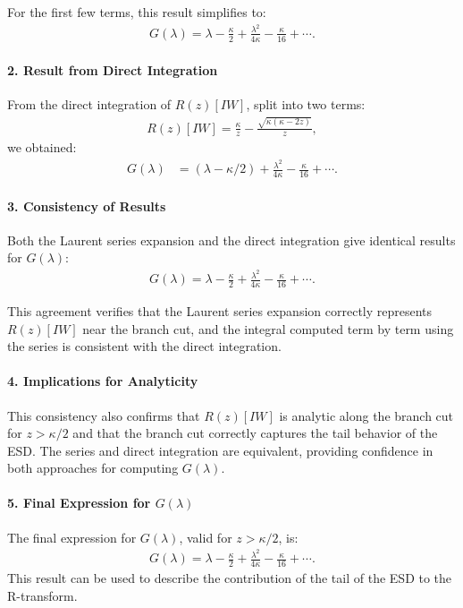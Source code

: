 For the first few terms, this result simplifies to:
\begin{align}
G(\lambda) = \lambda - \frac{\kappa}{2} + \frac{\lambda^2}{4\kappa} - \frac{\kappa}{16} + \cdots.
\end{align}

\paragraph{2. Result from Direct Integration}

From the direct integration of $R(z)[IW]$, split into two terms:
\begin{align}
R(z)[IW] = \frac{\kappa}{z} - \frac{\sqrt{\kappa(\kappa - 2z)}}{z},
\end{align}
we obtained:
\begin{align}
G(\lambda) &= (\lambda - \kappa/2) + \frac{\lambda^2}{4\kappa} - \frac{\kappa}{16} + \cdots.
\end{align}

\paragraph{3. Consistency of Results}

Both the Laurent series expansion and the direct integration give identical results for $G(\lambda)$:
\begin{align}
G(\lambda) = \lambda - \frac{\kappa}{2} + \frac{\lambda^2}{4\kappa} - \frac{\kappa}{16} + \cdots.
\end{align}

This agreement verifies that the Laurent series expansion correctly represents $R(z)[IW]$ near the branch cut, and the integral computed term by term using the series is consistent with the direct integration.

\paragraph{4. Implications for Analyticity}

This consistency also confirms that $R(z)[IW]$ is analytic along the branch cut for $z > \kappa/2$ and that the branch cut correctly captures the tail behavior of the ESD. The series and direct integration are equivalent, providing confidence in both approaches for computing $G(\lambda)$.

\paragraph{5. Final Expression for $G(\lambda)$}

The final expression for $G(\lambda)$, valid for $z > \kappa/2$, is:
\begin{align}
G(\lambda) = \lambda - \frac{\kappa}{2} + \frac{\lambda^2}{4\kappa} - \frac{\kappa}{16} + \cdots.
\end{align}
This result can be used to describe the contribution of the tail of the ESD to the R-transform.
